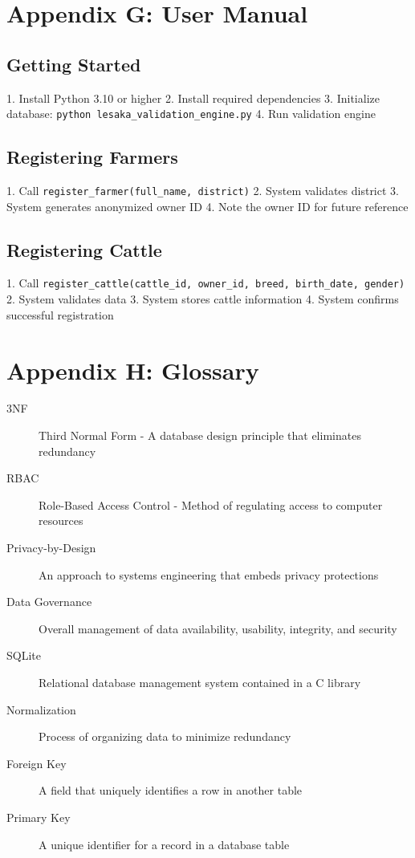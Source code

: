 \section*{Appendix G: User Manual}

\subsection*{Getting Started}
1. Install Python 3.10 or higher
2. Install required dependencies
3. Initialize database: \texttt{python lesaka\_validation\_engine.py}
4. Run validation engine

\subsection*{Registering Farmers}
1. Call \texttt{register\_farmer(full\_name, district)}
2. System validates district
3. System generates anonymized owner ID
4. Note the owner ID for future reference

\subsection*{Registering Cattle}
1. Call \texttt{register\_cattle(cattle\_id, owner\_id, breed, birth\_date, gender)}
2. System validates data
3. System stores cattle information
4. System confirms successful registration

\section*{Appendix H: Glossary}

\begin{description}
    \item[3NF] Third Normal Form - A database design principle that eliminates redundancy
    \item[RBAC] Role-Based Access Control - Method of regulating access to computer resources
    \item[Privacy-by-Design] An approach to systems engineering that embeds privacy protections
    \item[Data Governance] Overall management of data availability, usability, integrity, and security
    \item[SQLite] Relational database management system contained in a C library
    \item[Normalization] Process of organizing data to minimize redundancy
    \item[Foreign Key] A field that uniquely identifies a row in another table
    \item[Primary Key] A unique identifier for a record in a database table
\end{description}
